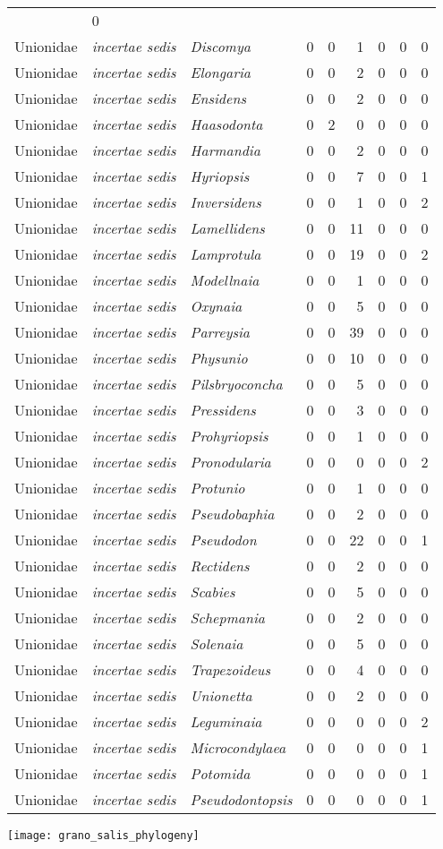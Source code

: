 \documentclass[11pt]{article}
\begin{document}
\begin{longtable}[l]{@{}lllrrrrrr@{}}
& 0\tabularnewline
Unionidae & \textit{incertae sedis} & \textit{Discomya} & 0 & 0 & 1 & 0 & 0
& 0\tabularnewline
Unionidae & \textit{incertae sedis} & \textit{Elongaria} & 0 & 0 & 2 & 0 & 0
& 0\tabularnewline
Unionidae & \textit{incertae sedis} & \textit{Ensidens} & 0 & 0 & 2 & 0 & 0
& 0\tabularnewline
Unionidae & \textit{incertae sedis} & \textit{Haasodonta} & 0 & 2 & 0 & 0 &
0 & 0\tabularnewline
Unionidae & \textit{incertae sedis} & \textit{Harmandia} & 0 & 0 & 2 & 0 & 0
& 0\tabularnewline
Unionidae & \textit{incertae sedis} & \textit{Hyriopsis} & 0 & 0 & 7 & 0 & 0
& 1\tabularnewline
Unionidae & \textit{incertae sedis} & \textit{Inversidens} & 0 & 0 & 1 & 0 &
0 & 2\tabularnewline
Unionidae & \textit{incertae sedis} & \textit{Lamellidens} & 0 & 0 & 11 & 0
& 0 & 0\tabularnewline
Unionidae & \textit{incertae sedis} & \textit{Lamprotula} & 0 & 0 & 19 & 0 &
0 & 2\tabularnewline
Unionidae & \textit{incertae sedis} & \textit{Modellnaia} & 0 & 0 & 1 & 0 &
0 & 0\tabularnewline
Unionidae & \textit{incertae sedis} & \textit{Oxynaia} & 0 & 0 & 5 & 0 & 0 &
0\tabularnewline
Unionidae & \textit{incertae sedis} & \textit{Parreysia} & 0 & 0 & 39 & 0 &
0 & 0\tabularnewline
Unionidae & \textit{incertae sedis} & \textit{Physunio} & 0 & 0 & 10 & 0 & 0
& 0\tabularnewline
Unionidae & \textit{incertae sedis} & \textit{Pilsbryoconcha} & 0 & 0 & 5 &
0 & 0 & 0\tabularnewline
Unionidae & \textit{incertae sedis} & \textit{Pressidens} & 0 & 0 & 3 & 0 &
0 & 0\tabularnewline
Unionidae & \textit{incertae sedis} & \textit{Prohyriopsis} & 0 & 0 & 1 & 0
& 0 & 0\tabularnewline
Unionidae & \textit{incertae sedis} & \textit{Pronodularia} & 0 & 0 & 0 & 0
& 0 & 2\tabularnewline
Unionidae & \textit{incertae sedis} & \textit{Protunio} & 0 & 0 & 1 & 0 & 0
& 0\tabularnewline
Unionidae & \textit{incertae sedis} & \textit{Pseudobaphia} & 0 & 0 & 2 & 0
& 0 & 0\tabularnewline
Unionidae & \textit{incertae sedis} & \textit{Pseudodon} & 0 & 0 & 22 & 0 &
0 & 1\tabularnewline
Unionidae & \textit{incertae sedis} & \textit{Rectidens} & 0 & 0 & 2 & 0 & 0
& 0\tabularnewline
Unionidae & \textit{incertae sedis} & \textit{Scabies} & 0 & 0 & 5 & 0 & 0 &
0\tabularnewline
Unionidae & \textit{incertae sedis} & \textit{Schepmania} & 0 & 0 & 2 & 0 &
0 & 0\tabularnewline
Unionidae & \textit{incertae sedis} & \textit{Solenaia} & 0 & 0 & 5 & 0 & 0
& 0\tabularnewline
Unionidae & \textit{incertae sedis} & \textit{Trapezoideus} & 0 & 0 & 4 & 0
& 0 & 0\tabularnewline
Unionidae & \textit{incertae sedis} & \textit{Unionetta} & 0 & 0 & 2 & 0 & 0
& 0\tabularnewline
Unionidae & \textit{incertae sedis} & \textit{Leguminaia} & 0 & 0 & 0 & 0 &
0 & 2\tabularnewline
Unionidae & \textit{incertae sedis} & \textit{Microcondylaea} & 0 & 0 & 0 &
0 & 0 & 1\tabularnewline
Unionidae & \textit{incertae sedis} & \textit{Potomida} & 0 & 0 & 0 & 0 & 0
& 1\tabularnewline
Unionidae & \textit{incertae sedis} & \textit{Pseudodontopsis} & 0 & 0 & 0 &
0 & 0 & 1\tabularnewline
\bottomrule
\end{longtable}

\newpage

\centering
	\texttt{[image: grano\_salis\_phylogeny]}
\end{document}
